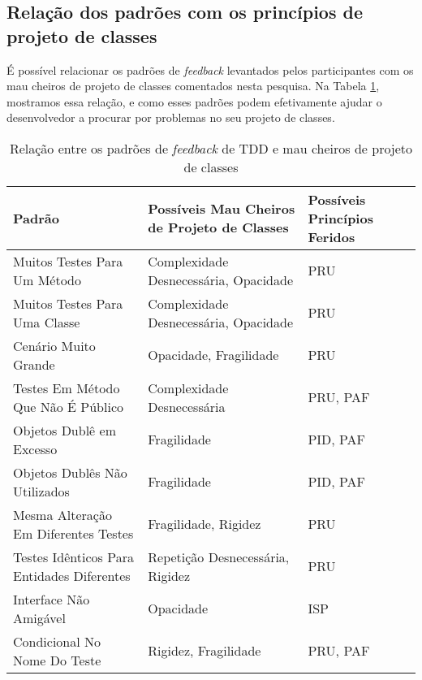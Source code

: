 \subsection{Relação dos padrões com os princípios de projeto de classes}

É possível relacionar os padrões de \textit{feedback} levantados pelos participantes
com os mau cheiros de projeto de classes comentados nesta pesquisa. Na Tabela \ref{tab:relacao-padroes},
mostramos essa relação, e como esses padrões podem efetivamente ajudar o desenvolvedor
a procurar por problemas no seu projeto de classes.


\begin{table}[h!]
	\centering
	\begin{tabular}{| p{7.5cm} | p{5cm} | p{2.5cm} | }
		\hline

		\textbf{Padrão} & \textbf{Possíveis Mau Cheiros de Projeto de Classes} & \textbf{Possíveis Princípios Feridos}\\
		
		\hline

		Muitos Testes Para Um Método                   & Complexidade Desnecessária, Opacidade   & PRU \\ \hline
		Muitos Testes Para Uma Classe                  & Complexidade Desnecessária, Opacidade   & PRU \\ \hline
		Cenário Muito Grande                           & Opacidade, Fragilidade                  & PRU \\ \hline
		Testes Em Método Que Não É Público             & Complexidade Desnecessária              & PRU, PAF \\ \hline
		Objetos Dublê em Excesso                       & Fragilidade                             & PID, PAF \\ \hline
		Objetos Dublês Não Utilizados                  & Fragilidade                             & PID, PAF \\ \hline
		Mesma Alteração Em Diferentes Testes           & Fragilidade, Rigidez                    & PRU \\ \hline
		Testes Idênticos Para Entidades Diferentes     & Repetição Desnecessária, Rigidez        & PRU  \\ \hline
		Interface Não Amigável                         & Opacidade                               & ISP \\ \hline
		Condicional No Nome Do Teste                   & Rigidez, Fragilidade                    & PRU, PAF \\

		\hline
		
	\end{tabular}
	\caption{Relação entre os padrões de \textit{feedback} de TDD e mau cheiros de projeto de classes}
	\label{tab:relacao-padroes}
\end{table}

